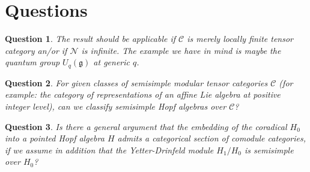\documentclass[11pt]{amsart}
\newcommand{\vc}{{\mathcal C}}
\renewcommand{\_}[1]{\mbox{$_{\left( #1 \right)}$}}
\theoremstyle{plain}
\numberwithin{equation}{section}
\newtheorem{question}{Question}[section]
\theoremstyle{definition}
\theoremstyle{remark}
\theoremstyle{introTheorems}
\begin{document}
\section{Questions}

\begin{question}
The result should be applicable if $\vc$ is merely locally finite tensor category an/or if $\mathcal{N}$ is infinite. The example we have in mind is maybe the quantum group $U_q(\mathfrak{g})$ at generic $q$.
\end{question}

\begin{question}
For given classes of semisimple modular tensor categories $\mathcal{C}$ (for example: the category of representations of an affine Lie algebra at positive integer level), can we classify semisimple Hopf algebras over $\mathcal{C}$?  
\end{question}

\begin{question}
Is there a general argument that the embedding of the coradical $H_0$ into a pointed Hopf algebra  $H$ admits a categorical section of comodule categories, if we assume in addition that the Yetter-Drinfeld module $H_1/H_0$ is semisimple over $H_0$?  
\end{question}
\end{document}
